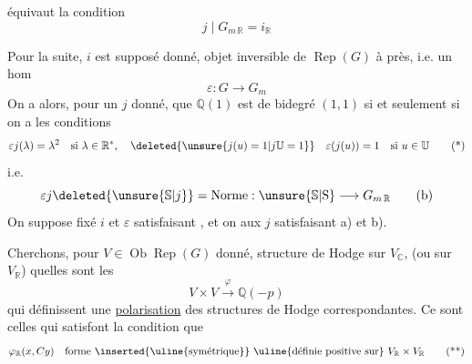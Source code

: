 équivaut  la condition
\[
j\mid G_{m\,\mathbb{R}}=i_{\mathbb{R}}\tag*{(a)}
\]

Pour la suite, $i$ est supposé donné,  objet inversible  de $\operatorname{Rep}(G)$ à  près, i.e. un hom \unsure{$\varepsilon$}
\[
\varepsilon:G\longrightarrow G_m
\]
On a alors, pour un $j$ donné, que $\mathbb{Q}(1)$ est de bidegré $(1,1)$ si et seulement si on a les conditions
\[
\varepsilon j(\lambda)=\lambda^2\quad\text{si }\lambda\in\mathbb{R}^{*},\quad
\deleted{\unsure{j(u)=1|j\mathbb{U}=1}}\quad
\varepsilon(j(u))=1\quad\text{si }u\in\mathbb{U}\tag*{(*)}
\]
i.e.
\[
\varepsilon j\deleted{\unsure{\mathbb{S}|j}}=\mathrm{Norme}:\unsure{\mathbb{S}|\mathrm{S}}\longrightarrow G_{m\,\mathbb{R}}\tag*{(b)}
\]
On suppose fixé $i$ et $\varepsilon$ satisfaisant , et on  aux $j$ satisfaisant a) et b).

 Cherchons, pour $V\in\operatorname{Ob}\operatorname{Rep}(G)$ donné,  structure de Hodge sur $V_{\mathbb{C}}$, (ou sur $V_{\mathbb{R}}$) quelles sont les 
\[
V\times V\xrightarrow{\varphi}\mathbb{Q}(-p)
\]
qui définissent une \uline{polarisation} des structures de Hodge correspondantes. Ce sont celles qui satisfont  la condition que
\[
\varphi_{\mathbb{R}}(x,Cy)\quad\text{forme \inserted{\uline{symétrique}} \uline{définie positive sur} } V_{\mathbb{R}}\times V_{\mathbb{R}}\tag*{(**)}
\]

